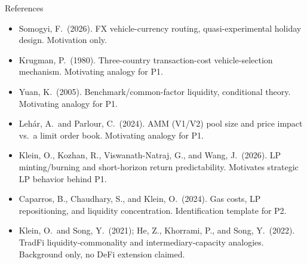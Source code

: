 \documentclass[aspectratio=169]{beamer}
\begin{document}
\begin{frame}{References}
  \footnotesize
  \begin{itemize}
    \item Somogyi, F.\ (2026). FX vehicle-currency routing, quasi-experimental holiday design. Motivation only.
    \item Krugman, P.\ (1980). Three-country transaction-cost vehicle-selection mechanism. Motivating analogy for P1.
    \item Yuan, K.\ (2005). Benchmark/common-factor liquidity, conditional theory. Motivating analogy for P1.
    \item Leh\'ar, A.\ and Parlour, C.\ (2024). AMM (V1/V2) pool size and price impact vs.\ a limit order book. Motivating analogy for P1.
    \item Klein, O., Kozhan, R., Viswanath-Natraj, G., and Wang, J.\ (2026). LP minting/burning and short-horizon return predictability. Motivates strategic LP behavior behind P1.
    \item Caparros, B., Chaudhary, S., and Klein, O.\ (2024). Gas costs, LP repositioning, and liquidity concentration. Identification template for P2.
    \item Klein, O.\ and Song, Y.\ (2021); He, Z., Khorrami, P., and Song, Y.\ (2022). TradFi liquidity-commonality and intermediary-capacity analogies. Background only, no DeFi extension claimed.
  \end{itemize}
\end{frame}
\end{document}
